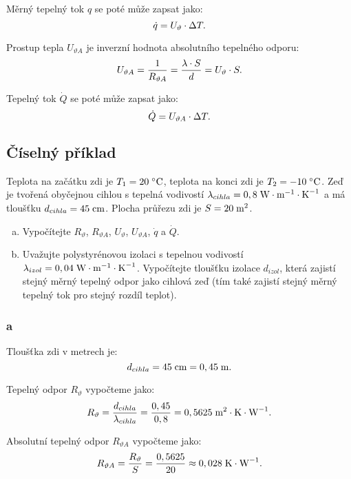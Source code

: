 \documentclass{article}
\begin{document}
Měrný tepelný tok $q$ se poté může zapsat jako:
\begin{equation}
    \dot{q} = U_\vartheta \cdot \Delta T.
    \unit{(\ueqWandMinvsq)}
\end{equation}

Prostup tepla $U_{\vartheta A}$ je inverzní hodnota absolutního tepelného odporu:
\begin{equation}
    U_{\vartheta A} = \frac{1}{R_{\vartheta A}} = \frac{\lambda \cdot S}{d} = U_\vartheta \cdot S.
    \unit{(\ueqWandKinv)}
\end{equation}

Tepelný tok $\dot{Q}$ se poté může zapsat jako:
\begin{equation}
    \dot{Q} = U_{\vartheta A} \cdot \Delta T.
    \unit{(\ueqW)}
\end{equation}



\subsection{Číselný příklad}
Teplota na začátku zdi je $T_1 = 20 \; ^\circ \textrm{C}$, teplota na konci zdi je $T_2 = -10 \; ^\circ \textrm{C}$. Zeď je tvořená obyčejnou cihlou s tepelná vodivostí $\lambda_{cihla} = 0,8 \; \textrm{W} \cdot \textrm{m}^{-1} \cdot \textrm{K}^{-1}$ a má tloušťku $d_{cihla} = 45 \; \textrm{cm}$. Plocha průřezu zdi je $S = 20 \; \textrm{m}^{\textrm{2}}$.
\begin{enumerate}[a)]
    \item Vypočítejte $R_{\vartheta}$, $R_{\vartheta A}$, $U_\vartheta$, $U_{\vartheta A}$, $\dot{q}$ a $\dot{Q}$.
    \item Uvažujte polystyrénovou izolaci s tepelnou vodivostí $\lambda_{izol} = 0,04 \; \textrm{W} \cdot \textrm{m}^{-1} \cdot \textrm{K}^{-1}$. Vypočítejte tloušťku izolace $d_{izol}$, která zajistí stejný měrný tepelný odpor jako cihlová zeď (tím také zajistí stejný měrný tepelný tok pro stejný rozdíl teplot).
\end{enumerate}


\subsubsection{a}
Tloušťka zdi v metrech je:
$$
    d_{cihla} = 45 \; \textrm{cm} = 0,45 \; \textrm{m}.
$$

Tepelný odpor $R_{\vartheta}$ vypočteme jako:
$$
    R_{\vartheta} = \frac{d_{cihla}}{\lambda_{cihla}} = \frac{0,45}{0,8} = 0,5625 \; \textrm{m}^{\textrm{2}} \cdot \textrm{K} \cdot \textrm{W}^{-1}.
$$

Absolutní tepelný odpor $R_{\vartheta A}$ vypočteme jako:
$$
    R_{\vartheta A} = \frac{R_{\vartheta}}{S} = \frac{0,5625}{20} \approx 0,028 \; \textrm{K} \cdot \textrm{W}^{-1}.
$$
\end{document}

